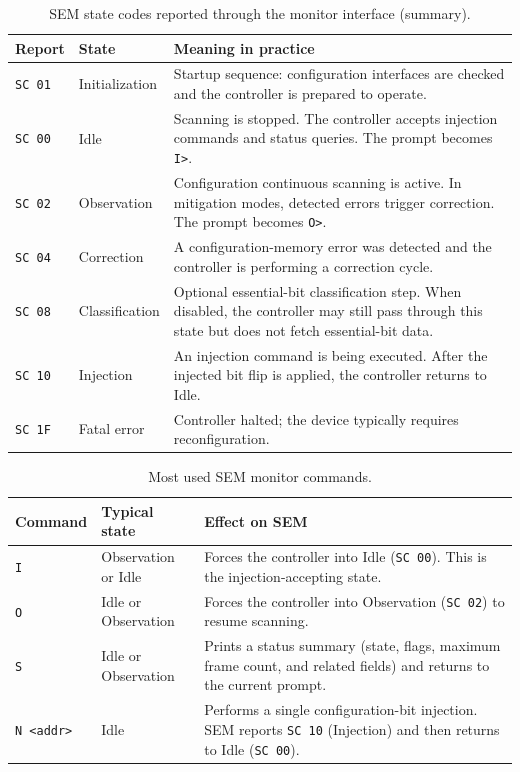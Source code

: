 \begin{table}[h]
\centering
\begin{tabularx}{\textwidth}{|l|l|X|}
\hline
\rowcolor{tableheader}\textbf{Report} & \textbf{State} & \textbf{Meaning in practice} \\
\hline
\hline
\texttt{SC 01} & Initialization & Startup sequence: configuration interfaces are checked and the controller is prepared to operate. \\
\hline
\texttt{SC 00} & Idle & Scanning is stopped. The controller accepts injection commands and status queries. The prompt becomes \texttt{I>}. \\
\hline
\texttt{SC 02} & Observation & Configuration continuous scanning is active. In mitigation modes, detected errors trigger correction. The prompt becomes \texttt{O>}. \\
\hline
\texttt{SC 04} & Correction & A configuration-memory error was detected and the controller is performing a correction cycle. \\
\hline
\texttt{SC 08} & Classification & Optional essential-bit classification step. When disabled, the controller may still pass through this state but does not fetch essential-bit data. \\
\hline
\texttt{SC 10} & Injection & An injection command is being executed. After the injected bit flip is applied, the controller returns to Idle. \\
\hline
\texttt{SC 1F} & Fatal error & Controller halted; the device typically requires reconfiguration. \\
\hline
\end{tabularx}
\caption{SEM state codes reported through the monitor interface (summary).}
\label{tab:sem_state_codes}
\end{table}


\begin{table}[h]
\centering
\begin{tabularx}{\textwidth}{|l|l|X|}
\hline
\rowcolor{tableheader}\textbf{Command} & \textbf{Typical state} & \textbf{Effect on SEM} \\
\hline
\hline
\texttt{I} & Observation or Idle & Forces the controller into Idle (\texttt{SC 00}). This is the injection-accepting state. \\
\hline
\texttt{O} & Idle or Observation & Forces the controller into Observation (\texttt{SC 02}) to resume scanning. \\
\hline
\texttt{S} & Idle or Observation & Prints a status summary (state, flags, maximum frame count, and related fields) and returns to the current prompt. \\
\hline
\texttt{N <addr>} & Idle & Performs a single configuration-bit injection. SEM reports \texttt{SC 10} (Injection) and then returns to Idle (\texttt{SC 00}). \\
\hline
\end{tabularx}
\caption{Most used SEM monitor commands. }
\label{tab:sem_cmds_most_used}
\end{table}


